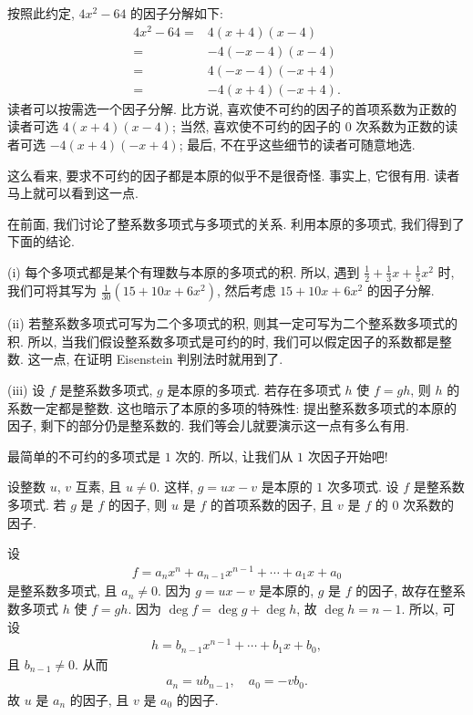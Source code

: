 \begin{example}
    按照此约定, $4x^2 - 64$ 的因子分解如下:
    \begin{align*}
        4x^2 - 64
        = {} & 4 (x + 4) (x - 4)   \\
        = {} & -4 (-x - 4) (x - 4) \\
        = {} & 4 (-x - 4) (-x + 4) \\
        = {} & -4 (x + 4)(-x + 4).
    \end{align*}
    读者可以按需选一个因子分解. 比方说, 喜欢使不可约的因子的首项系数为正数的读者可选 $4 (x + 4) (x - 4)$; 当然, 喜欢使不可约的因子的 $0$ 次系数为正数的读者可选 $-4 (x + 4) (-x + 4)$; 最后, 不在乎这些细节的读者可随意地选.

    这么看来, 要求不可约的因子都是本原的似乎不是很奇怪. 事实上, 它很有用. 读者马上就可以看到这一点.
\end{example}

在前面, 我们讨论了整系数多项式与多项式的关系. 利用本原的多项式, 我们得到了下面的结论.

(i) 每个多项式都是某个有理数与本原的多项式的积. 所以, 遇到 $\frac12 + \frac13 x + \frac15 x^2$ 时, 我们可将其写为 $\frac{1}{30} (15 + 10x + 6x^2)$, 然后考虑 $15 + 10x + 6x^2$ 的因子分解.

(ii) 若整系数多项式可写为二个多项式的积, 则其一定可写为二个整系数多项式的积. 所以, 当我们假设整系数多项式是可约的时, 我们可以假定因子的系数都是整数. 这一点, 在证明 Eisenstein 判别法时就用到了.

(iii) 设 $f$ 是整系数多项式, $g$ 是本原的多项式. 若存在多项式 $h$ 使 $f = gh$, 则 $h$ 的系数一定都是整数. 这也暗示了本原的多项的特殊性: 提出整系数多项式的本原的因子, 剩下的部分仍是整系数的. 我们等会儿就要演示这一点有多么有用.

最简单的不可约的多项式是 $1$ 次的. 所以, 让我们从 $1$ 次因子开始吧!

\begin{proposition}
    设整数 $u$, $v$ 互素, 且 $u \neq 0$. 这样, $g = ux - v$ 是本原的 $1$ 次多项式. 设 $f$ 是整系数多项式. 若 $g$ 是 $f$ 的因子, 则 $u$ 是 $f$ 的首项系数的因子, 且 $v$ 是 $f$ 的 $0$ 次系数的因子.
\end{proposition}

\begin{pf}
    设
    \begin{align*}
        f = a_n x^n + a_{n-1} x^{n-1} + \cdots + a_1 x + a_0
    \end{align*}
    是整系数多项式, 且 $a_n \neq 0$. 因为 $g = ux - v$ 是本原的, $g$ 是 $f$ 的因子, 故存在整系数多项式 $h$ 使 $f = gh$. 因为 $\deg f = \deg g + \deg h$, 故 $\deg h = n - 1$. 所以, 可设
    \begin{align*}
        h = b_{n-1} x^{n-1} + \cdots + b_1 x + b_0,
    \end{align*}
    且 $b_{n-1} \neq 0$. 从而
    \begin{align*}
        a_n = ub_{n-1}, \quad a_0 = -vb_0.
    \end{align*}
    故 $u$ 是 $a_n$ 的因子, 且 $v$ 是 $a_0$ 的因子.
\end{pf}

